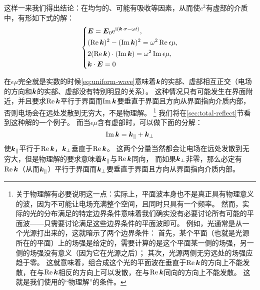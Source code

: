 这样一来我们得出结论：在均匀的、可能有吸收等因素，从而使$c^2$有虚部的介质中，有形如下式的解：
\begin{equation}
    \left\{
        \begin{aligned}
            &\vb*{E} = \vb*{E}_0 \mathrm{e}^{\mathrm{i} (\vb*{k} \cdot \vb*{r} - \omega t)}, \\
            &(\Re \vb*{k})^2 - (\Im \vb*{k})^2 = \omega^2 \Re \epsilon\mu, \\
            &2 (\Re \vb*{k}) \cdot (\Im \vb*{\vb*{k}}) = \omega^2 \Im \epsilon\mu, \\
            &\vb*{k} \cdot \vb*{E} = 0
        \end{aligned}
    \right.
    \label{eq:uniform-wave}
\end{equation}

在$\epsilon\mu$完全就是实数的时候\eqref{eq:uniform-wave}意味着$\vb*{k}$的实部、虚部相互正交（电场的方向和$\vb*{k}$的实部、虚部没有特别明显的关系）。
这种情况只有可能发生在界面附近，并且要求$\Re \vb*{k}$平行于界面而$\Im \vb*{k}$要垂直于界面且方向从界面指向介质内部，
否则电场会在远处发散到无穷大，不是物理解。%
\footnote{关于物理解有必要说明这一点：实际上，平面波本身也不是真正具有物理意义的波，因为不可能让电场充满整个空间，且同时只具有一个频率。
然而，实际的光的分布满足的特定边界条件意味着我们确实没有必要讨论所有可能的平面波——只需要讨论满足这些边界条件的平面波即可。
例如，光通常是从一个光源打出来的，这就暗示了两个边界条件：
首先，某个平面（也就是光源所在的平面）上的场强是给定的，需要计算的是这个平面某一侧的场强，另一侧的场强没有意义（因为它在光源之后）；
其次，光源两侧无穷远处的场强应趋于零。
这就意味着，组合成这个光的平面波在垂直于$\Re \vb*{k}$的方向上不能发散，在与$\Re\vb*{k}$相反的方向上可以发散，在与$\Re\vb*{k}$同向的方向上不能发散。
这就是我们使用的“物理解”的条件。
}
我们将在\ref{sec:total-reflect}节看到这种解的一个例子。
而当$\epsilon\mu$含有虚部时，可以做下面的分解：
\[
    \Im \vb*{k} = \vb*{k}_\parallel + \vb*{k}_\bot
\]
使$\vb*{k}_\parallel$平行于$\Re\vb*{k}$，$\vb*{k}_\bot$垂直于$\Re\vb*{k}$。
这两个分量当然都会让电场在远处发散到无穷大，但是物理解的要求意味着$\vb*{k}_\parallel$与$\Re \vb*{k}$同向，
而如果$\vb*{k}_\bot$非零，那么必定有$\Re \vb*{k}$（从而$\vb*{k}_\parallel$）平行于界面而$\vb*{k}_\bot$要垂直于界面且方向从界面指向介质内部。

